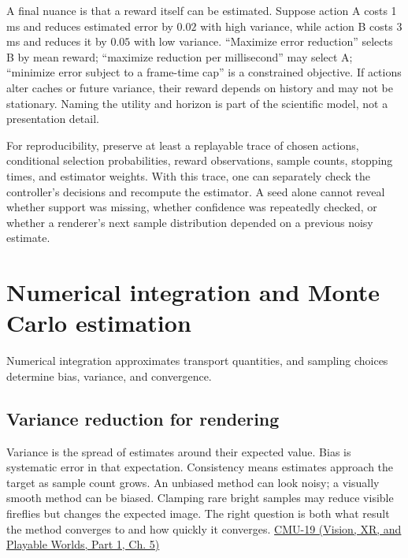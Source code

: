 A final nuance is that a reward itself can be estimated. Suppose action A costs 1 ms and reduces estimated error by \(0.02\) with high variance, while action B costs 3 ms and reduces it by \(0.05\) with low variance. ``Maximize error reduction'' selects B by mean reward; ``maximize reduction per millisecond'' may select A; ``minimize error subject to a frame-time cap'' is a constrained objective. If actions alter caches or future variance, their reward depends on history and may not be stationary. Naming the utility and horizon is part of the scientific model, not a presentation detail.

For reproducibility, preserve at least a replayable trace of chosen actions, conditional selection probabilities, reward observations, sample counts, stopping times, and estimator weights. With this trace, one can separately check the controller's decisions and recompute the estimator. A seed alone cannot reveal whether support was missing, whether confidence was repeatedly checked, or whether a renderer's next sample distribution depended on a previous noisy estimate.

\section{Numerical integration and Monte Carlo estimation}\label{03-visual-computing-i-ch012-numerical-integration-and-monte-carlo-estimation}

\hypertarget{03-visual-computing-i-ch012-numerical-integration-and-monte-carlo-estimation}{}

Numerical integration approximates transport quantities, and sampling choices determine bias, variance, and convergence.

\subsection{Variance reduction for rendering}\label{03-visual-computing-i-ch012-variance-reduction-for-rendering}

\hypertarget{03-visual-computing-i-ch012-variance-reduction-for-rendering}{}

Variance is the spread of estimates around their expected value. Bias is systematic error in that expectation. Consistency means estimates approach the target as sample count grows. An unbiased method can look noisy; a visually smooth method can be biased. Clamping rare bright samples may reduce visible fireflies but changes the expected image. The right question is both what result the method converges to and how quickly it converges. \href{../07-Vision-XR-and-Playable-Worlds-P01/main.pdf\#04-visual-computing-ii-ch036-cmu-19---variance-reduction}{CMU-19 (Vision, XR, and Playable Worlds, Part 1, Ch. 5)}


